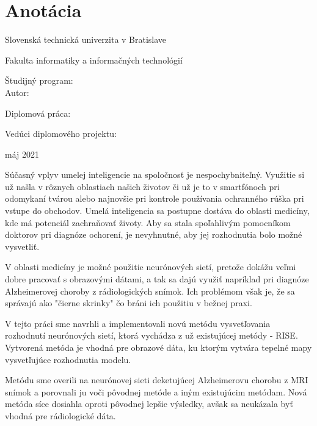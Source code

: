 
\thispagestyle{empty}
\section*{Anotácia}

\begin{minipage}[t]{1\columnwidth}%
Slovenská technická univerzita v Bratislave

Fakulta informatiky a informačných technológií

Študijný program: \myStudyProgram\\

Autor: \myName

Diplomová práca: \myTitle

Vedúci diplomového projektu: \mySupervisor

máj 2021
\end{minipage}

\bigskip{}

Súčasný vplyv umelej inteligencie na spoločnosť je nespochybniteľný. Využitie si už našla v rôznych oblastiach našich životov či už je to v smartfónoch pri odomykaní tvárou alebo najnovšie pri kontrole používania ochranného rúška pri vstupe do obchodov. Umelá inteligencia sa postupne dostáva do oblasti medicíny, kde má potenciál zachraňovať životy. Aby sa stala spoľahlivým pomocníkom doktorov pri diagnóze ochorení, je nevyhnutné, aby jej rozhodnutia bolo možné vysvetliť. 

V oblasti medicíny je možné použitie neurónových sietí, pretože dokážu veľmi dobre pracovať s obrazovými dátami, a tak sa dajú využiť napríklad pri diagnóze Alzheimerovej choroby z rádiologických snímok. Ich problémom však je, že sa správajú ako "čierne skrinky" čo bráni ich použitiu v bežnej praxi.

V tejto práci sme navrhli a implementovali novú metódu vysvetľovania rozhodnutí neurónových sietí, ktorá vychádza z už existujúcej metódy - RISE. Vytvorená metóda je vhodná pre obrazové dáta, ku ktorým vytvára tepelné mapy vysvetľujúce rozhodnutia modelu.

Metódu sme overili na neurónovej sieti deketujúcej Alzheimerovu chorobu z MRI snímok a porovnali ju voči pôvodnej metóde a iným existujúcim metódam. Nová metóda síce dosiahla oproti pôvodnej lepšie výsledky, avšak sa neukázala byť vhodná pre rádiologické dáta.

\newpage
\thispagestyle{empty}
\mbox{}
\newpage